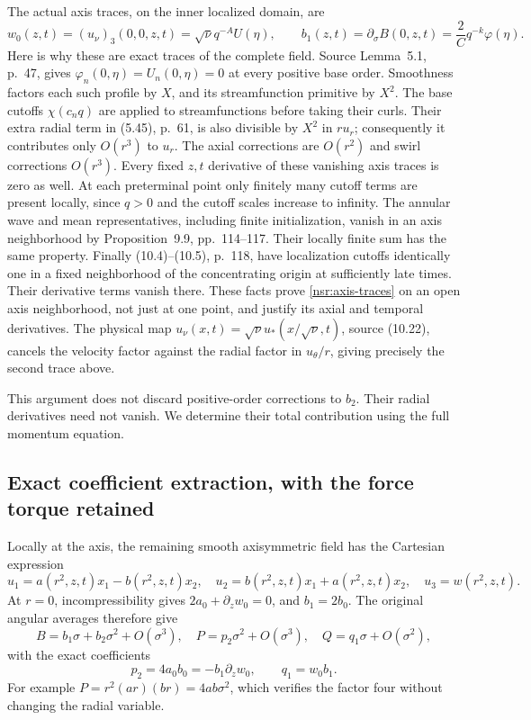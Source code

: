 The actual axis traces, on the inner localized domain, are
\begin{equation}\label{nsr:axis-traces}
 w_0(z,t)=(u_\nu)_3(0,0,z,t)=\sqrt\nu q^{-A}U(\eta),\qquad
 b_1(z,t)=\partial_\sigma B(0,z,t)=\frac2C q^{-k}\varphi(\eta).
\end{equation}
Here is why these are exact traces of the complete field. Source
Lemma~5.1, p.~47, gives \(\varphi_n(0,\eta)=U_n(0,\eta)=0\)
at every positive base order. Smoothness factors each such profile
by \(X\), and its streamfunction primitive by \(X^2\).
The base cutoffs \(\chi(c_nq)\) are applied to streamfunctions
before taking their curls. Their extra radial term in (5.45), p.~61,
is also divisible by \(X^2\) in \(r u_r\); consequently it
contributes only \(O(r^3)\) to \(u_r\). The axial corrections are
\(O(r^2)\) and swirl corrections \(O(r^3)\). Every fixed
\(z,t\) derivative of these vanishing axis traces is zero as well.
At each preterminal point only finitely many cutoff terms are
present locally, since \(q>0\) and the cutoff scales increase to
infinity. The annular wave and mean representatives, including finite
initialization, vanish in an axis neighborhood by Proposition~9.9,
pp.~114--117. Their locally finite sum has the same property.
Finally (10.4)--(10.5), p.~118, have localization cutoffs identically
one in a fixed neighborhood of the concentrating origin at sufficiently
late times. Their derivative terms vanish there. These facts prove
\eqref{nsr:axis-traces} on an open axis neighborhood, not just at one
point, and justify its axial and temporal derivatives. The physical
map \(u_\nu(x,t)=\sqrt\nu u_*(x/\sqrt\nu,t)\), source (10.22),
cancels the velocity factor against the radial factor in
\(u_\theta/r\), giving precisely the second trace above.

This argument does not discard positive-order corrections to \(b_2\).
Their radial derivatives need not vanish. We determine their total
contribution using the full momentum equation.

\subsection{Exact coefficient extraction, with the force torque retained}

Locally at the axis, the remaining smooth axisymmetric field has the
Cartesian expression
\[
 u_1=a(r^2,z,t)x_1-b(r^2,z,t)x_2,\quad
 u_2=b(r^2,z,t)x_1+a(r^2,z,t)x_2,\quad
 u_3=w(r^2,z,t).
\]
At \(r=0\), incompressibility gives \(2a_0+\partial_z w_0=0\),
and \(b_1=2b_0\). The original angular averages therefore give
\[
 B=b_1\sigma+b_2\sigma^2+O(\sigma^3),\quad
 P=p_2\sigma^2+O(\sigma^3),\quad Q=q_1\sigma+O(\sigma^2),
\]
with the exact coefficients
\begin{equation}\label{nsr:fluxes}
 p_2=4a_0b_0=-b_1\partial_z w_0,\qquad q_1=w_0b_1.
\end{equation}
For example \(P=r^2(ar)(br)=4ab\sigma^2\), which verifies
the factor four without changing the radial variable.

